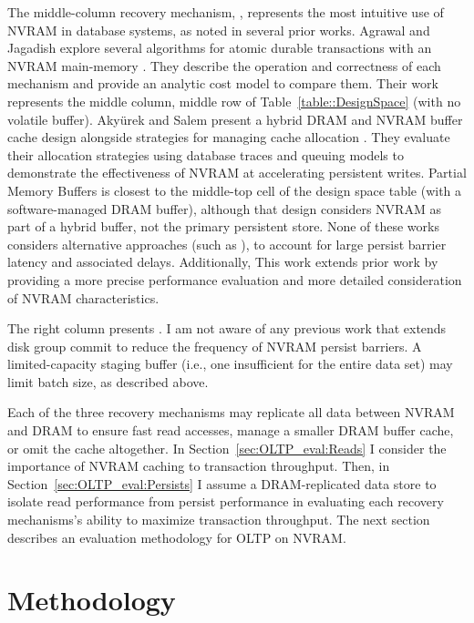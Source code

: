 The middle-column recovery mechanism, \InPlace, represents the most intuitive use of NVRAM in database systems, as noted in several prior works.
Agrawal and Jagadish explore several algorithms for atomic durable transactions with an NVRAM main-memory \cite{AgrawalJagadish89}.
They describe the operation and correctness of each mechanism and provide an analytic cost model to compare them.
Their work represents the middle column, middle row of Table~\ref{table::DesignSpace} (\InPlace with no volatile buffer).
Aky\"{u}rek and Salem present a hybrid DRAM and NVRAM buffer cache design alongside strategies for managing cache allocation \cite{SalemAkyrek95}.
They evaluate their allocation strategies using database traces and queuing models to demonstrate the effectiveness of NVRAM at accelerating persistent writes.
Partial Memory Buffers is closest to the middle-top cell of the design space table (\InPlace with a software-managed DRAM buffer), although that design considers NVRAM as part of a hybrid buffer, not the primary persistent store.
None of these works considers alternative approaches (such as \GroupCommit), to account for large persist barrier latency and associated delays.
Additionally, This work extends prior work by providing a more precise performance evaluation and more detailed consideration of NVRAM characteristics.

The right column presents \GroupCommit.
I am not aware of any previous work that extends disk group commit to reduce the frequency of NVRAM persist barriers.
A limited-capacity staging buffer (i.e., one insufficient for the entire data set) may limit batch size, as described above.

Each of the three recovery mechanisms may replicate all data between NVRAM and DRAM to ensure fast read accesses, manage a smaller DRAM buffer cache, or omit the cache altogether.
In Section~\ref{sec:OLTP_eval:Reads} I consider the importance of NVRAM caching to transaction throughput.
Then, in Section~\ref{sec:OLTP_eval:Persists} I assume a DRAM-replicated data store to isolate read performance from persist performance in evaluating each recovery mechanisms's ability to maximize transaction throughput.
The next section describes an evaluation methodology for OLTP on NVRAM.

\section{Methodology}
\label{sec:OLTP_design:Methodology}

